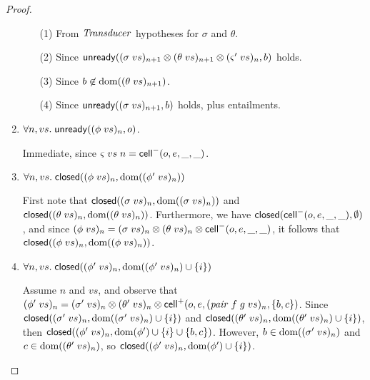 \begin{proof}
\begin{enumerate}
  \begin{itemize}
    \item[(1)] From $\mathit{Transducer}$ hypotheses for $\sigma$ and $\theta$.
    \item[(2)] Since $\mathsf{unready}({(\sigma\;vs)_{n+1} \otimes (\theta\;vs)_{n+1} \otimes (\varsigma'\;vs)_n}, {b})$ holds.
    \item[(3)] Since $b\not\in \mbox{dom}({(\theta\;vs)_{n+1}})$. 
    \item[(4)] Since $\mathsf{unready}({(\sigma\;vs)_{n+1}}, {b})$ holds, plus entailments. 
  \end{itemize}

\item $\forall n, vs.\; \mathsf{unready}({(\phi\;vs)_n}, {o})$.

  Immediate, since $\varsigma\;vs\;n = \mathsf{cell}^{-}({o}, {e}, {\_}, {\_})$. 

\item $\forall n, vs.\; \mathsf{closed}({(\phi\;vs)_n}, {\mbox{dom}({(\phi'\;vs)_n})})$

  First note that $\mathsf{closed}({(\sigma\;vs)_n}, {\mbox{dom}({(\sigma\;vs)_n})})$
  and $\mathsf{closed}({(\theta\;vs)_n}, {\mbox{dom}({(\theta\;vs)_n})})$. 
  Furthermore, we have  $\mathsf{closed}({\mathsf{cell}^{-}({o}, {e}, {\_}, {\_})}, {\emptyset})$, 
  and since $(\phi\;vs)_n = (\sigma\;vs)_n \otimes (\theta\;vs)_n \otimes \mathsf{cell}^{-}({o}, {e}, {\_}, {\_})$,
  it follows that 
  $\mathsf{closed}({(\phi\;vs)_n}, {\mbox{dom}({(\phi\;vs)_n})})$.

\item $\forall n, vs.\; \mathsf{closed}({(\phi'\;vs)_n}, {\mbox{dom}({(\phi'\;vs)_n}) \cup \{{i}\}})$ 

  Assume $n$ and $vs$, and observe that $(\phi'\;vs)_n = (\sigma'\;vs)_n \otimes (\theta'\;vs)_n \otimes \mathsf{cell}^{+}({o}, {e}, {(\mathit{pair}\;f\;g\;vs)_n}, {\{{b,c}\}})$.
  Since $\mathsf{closed}({(\sigma'\;vs)_n}, {\mbox{dom}({(\sigma'\;vs)_n}) \cup \{{i}\}})$ and 
  $\mathsf{closed}({(\theta'\;vs)_n}, {\mbox{dom}({(\theta'\;vs)_n}) \cup \{{i}\}})$, then 
  $\mathsf{closed}({(\phi'\;vs)_n}, {\mbox{dom}({\phi'}) \cup \{{i}\} \cup \{{b,c}\}})$. However, $b \in \mbox{dom}({(\sigma'\;vs)_n})$ and $c \in \mbox{dom}({(\theta'\;vs)_n})$, 
  so $\mathsf{closed}({(\phi'\;vs)_n}, {\mbox{dom}({\phi'}) \cup \{{i}\}})$.



\end{enumerate}
\end{proof}
